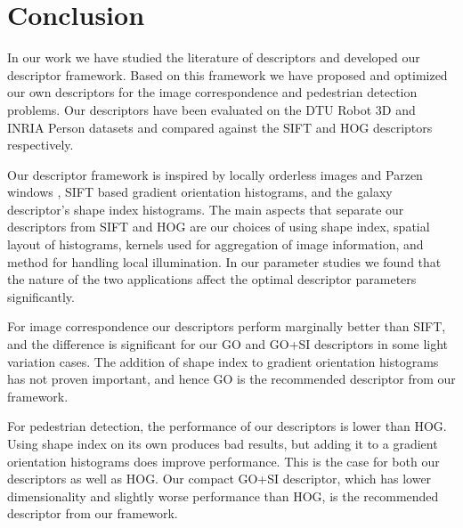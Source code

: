 \documentclass[thesis.tex]{subfiles}
\begin{document}
\chapter{Conclusion}

In our work we have studied the literature of descriptors and developed our descriptor framework. Based on this framework we have proposed and optimized our own descriptors for the image correspondence and pedestrian detection problems. Our descriptors have been evaluated on the DTU Robot 3D and INRIA Person datasets and compared against the SIFT \cite{lowe2004distinctive} and HOG \cite{felzenszwalb2009object} descriptors respectively.

Our descriptor framework is inspired by locally orderless images \cite{koenderink1999structure} and Parzen windows \cite{parzen1962estimation}, SIFT based gradient orientation histograms, and the galaxy descriptor's \cite{pedersen2013shape} shape index histograms. The main aspects that separate our descriptors from SIFT and HOG are our choices of using shape index, spatial layout of histograms, kernels used for aggregation of image information, and method for handling local illumination. In our parameter studies we found that the nature of the two applications affect the optimal descriptor parameters significantly.

For image correspondence our descriptors perform marginally better than SIFT, and the difference is significant for our GO and GO+SI descriptors in some light variation cases. The addition of shape index to gradient orientation histograms has not proven important, and hence GO is the recommended descriptor from our framework.

For pedestrian detection, the performance of our descriptors is lower than HOG. Using shape index on its own produces bad results, but adding it to a gradient orientation histograms does improve performance. This is the case for both our descriptors as well as HOG. Our compact GO+SI descriptor, which has lower dimensionality and slightly worse performance than HOG, is the recommended descriptor from our framework.

\subbibliography
\end{document}
